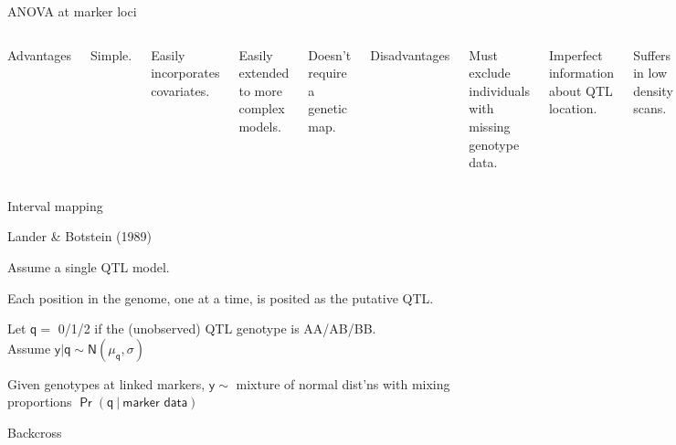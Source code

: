 \documentclass[aspectratio=169,12pt,t]{beamer}
\begin{document}
\begin{frame}{ANOVA at marker loci}

\begin{columns}

{\hilit Advantages}

\bi
\item Simple.
\item Easily incorporates covariates.
\item Easily extended to more complex models.
\item Doesn't require a genetic map.
\ei



{\hilit Disadvantages}

\bi
\item Must exclude individuals with missing genotype data.
\item Imperfect information about QTL location.
\item Suffers in low density scans.
\item {\vhilit Only considers one QTL at a time.}
\ei

\end{columns}

\end{frame}




\begin{frame}{Interval mapping}

{\hilit Lander \& Botstein (1989)}

\bbi
  \item Assume a {\hilit single} QTL model.
  \item Each position in the genome, one at a time, is posited as the
  putative QTL.
  \item Let $\mathsf{q = }$ 0/1/2 if the (unobserved) QTL genotype is
  AA/AB/BB. \\[12pt]
        Assume $\mathsf{y | q \sim N(\mu_q, \sigma)}$
  \item Given genotypes at linked markers, $\mathsf{y \sim}$ mixture of normal
  dist'ns with mixing proportions $\mathsf{\Pr(q \ | \ \text{marker data})}$
\ei

\end{frame}

\begin{frame}[c]{Backcross}
\end{frame}
\end{document}
